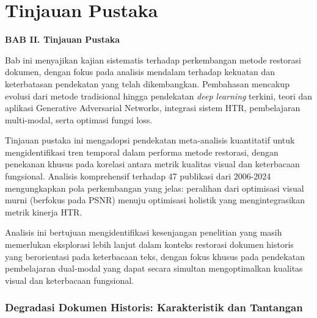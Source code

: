 \documentclass[12pt,a4paper]{book}
\begin{document}
\chapter{Tinjauan Pustaka}


\vspace{2cm}
\begin{center}
{\fontsize{14}{16.8}\selectfont\textbf{BAB II. Tinjauan Pustaka}}\\[1em]
\end{center}
\label{sec:pendahuluan}
\setcounter{section}{2}
\setcounter{subsection}{0}




\vspace{1.5ex}

Bab ini menyajikan kajian sistematis terhadap perkembangan metode restorasi dokumen, dengan fokus pada analisis mendalam terhadap kekuatan dan keterbatasan pendekatan yang telah dikembangkan. Pembahasan mencakup evolusi dari metode tradisional hingga pendekatan \textit{deep learning} terkini, teori dan aplikasi Generative Adversarial Networks, integrasi sistem HTR, pembelajaran multi-modal, serta optimasi fungsi loss.

Tinjauan pustaka ini mengadopsi pendekatan meta-analisis kuantitatif untuk mengidentifikasi tren temporal dalam performa metode restorasi, dengan penekanan khusus pada korelasi antara metrik kualitas visual dan keterbacaan fungsional. Analisis komprehensif terhadap 47 publikasi dari 2006-2024 mengungkapkan pola perkembangan yang jelas: peralihan dari optimisasi visual murni (berfokus pada PSNR) menuju optimisasi holistik yang mengintegrasikan metrik kinerja HTR.

Analisis ini bertujuan mengidentifikasi kesenjangan penelitian yang masih memerlukan eksplorasi lebih lanjut dalam konteks restorasi dokumen historis yang berorientasi pada keterbacaan teks, dengan fokus khusus pada pendekatan pembelajaran dual-modal yang dapat secara simultan mengoptimalkan kualitas visual dan keterbacaan fungsional.

\subsection{Degradasi Dokumen Historis: Karakteristik dan Tantangan}
\label{subsec:degradasi-dokumen}
\end{document}
